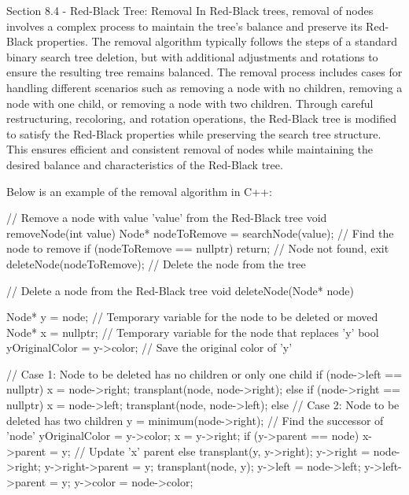 \begin{notes}{Section 8.4 - Red-Black Tree: Removal}
    In Red-Black trees, removal of nodes involves a complex process to maintain the tree's balance and preserve its Red-Black properties. The removal algorithm typically follows the steps of a standard binary search tree deletion, but with additional adjustments and rotations to ensure the resulting tree remains balanced. The removal process 
    includes cases for handling different scenarios such as removing a node with no children, removing a node with one child, or removing a node with two children. Through careful restructuring, recoloring, and rotation operations, the Red-Black tree is modified to satisfy the Red-Black properties while preserving the search tree structure. This 
    ensures efficient and consistent removal of nodes while maintaining the desired balance and characteristics of the Red-Black tree.
    
    \begin{highlight}
        Below is an example of the removal algorithm in C++:
    
    \begin{code}[C++]
    // Remove a node with value 'value' from the Red-Black tree
    void removeNode(int value) {
        Node* nodeToRemove = searchNode(value); // Find the node to remove
        if (nodeToRemove == nullptr) {
            return; // Node not found, exit
        }
        deleteNode(nodeToRemove); // Delete the node from the tree
    }
    
    // Delete a node from the Red-Black tree
    void deleteNode(Node* node) {
        Node* y = node; // Temporary variable for the node to be deleted or moved
        Node* x = nullptr; // Temporary variable for the node that replaces 'y'
        bool yOriginalColor = y->color; // Save the original color of 'y'
    
        // Case 1: Node to be deleted has no children or only one child
        if (node->left == nullptr) {
            x = node->right;
            transplant(node, node->right);
        }
        else if (node->right == nullptr) {
            x = node->left;
            transplant(node, node->left);
        }
        else {
            // Case 2: Node to be deleted has two children
            y = minimum(node->right); // Find the successor of 'node'
            yOriginalColor = y->color;
            x = y->right;
            if (y->parent == node) {
                x->parent = y; // Update 'x' parent
            }
            else {
                transplant(y, y->right);
                y->right = node->right;
                y->right->parent = y;
            }
            transplant(node, y);
            y->left = node->left;
            y->left->parent = y;
            y->color = node->color;
        }
    
}
\end{code}
\end{highlight}
\end{notes}
